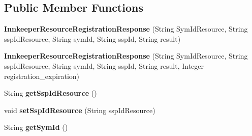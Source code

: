 \subsection*{Public Member Functions}
\begin{DoxyCompactItemize}
\item 
\mbox{\label{classeu_1_1h2020_1_1symbiote_1_1ssp_1_1model_1_1InnkeeperResourceRegistrationResponse_a0ee54cb43e20598bbec9d99efcbfcd1d}} 
{\bfseries Innkeeper\+Resource\+Registration\+Response} (String Sym\+Id\+Resource, String ssp\+Id\+Resource, String sym\+Id, String ssp\+Id, String result)
\item 
\mbox{\label{classeu_1_1h2020_1_1symbiote_1_1ssp_1_1model_1_1InnkeeperResourceRegistrationResponse_af8a7dc5e8440df3c2d5d45778901e766}} 
{\bfseries Innkeeper\+Resource\+Registration\+Response} (String Sym\+Id\+Resource, String ssp\+Id\+Resource, String sym\+Id, String ssp\+Id, String result, Integer registration\+\_\+expiration)
\item 
\mbox{\label{classeu_1_1h2020_1_1symbiote_1_1ssp_1_1model_1_1InnkeeperResourceRegistrationResponse_a0c264cfdaf06be553a40fd1dc2caf57b}} 
String {\bfseries get\+Ssp\+Id\+Resource} ()
\item 
\mbox{\label{classeu_1_1h2020_1_1symbiote_1_1ssp_1_1model_1_1InnkeeperResourceRegistrationResponse_a3e130535b10bc24b9a6ac8fc5301a408}} 
void {\bfseries set\+Ssp\+Id\+Resource} (String ssp\+Id\+Resource)
\item 
\mbox{\label{classeu_1_1h2020_1_1symbiote_1_1ssp_1_1model_1_1InnkeeperResourceRegistrationResponse_a22c127effa482b813a004b23d73d3b3a}} 
String {\bfseries get\+Sym\+Id} ()
\item 
\mbox{\label{classeu_1_1h2020_1_1symbiote_1_1ssp_1_1model_1_1InnkeeperResourceRegistrationResponse_a23c85989c0cb3787d4761c070f75ddf9}} 

\end{DoxyCompactItemize}
